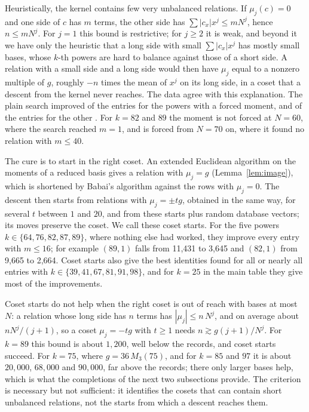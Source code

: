 \documentclass[11pt]{amsart}
\theoremstyle{definition}
\theoremstyle{remark}
\begin{document}
Heuristically, the kernel contains few very unbalanced relations. If $\mu_j(c)=0$ and one side of
$c$ has $m$ terms, the other side has $\sum|c_x|x^j\le mN^j$, hence $n\le mN^j$. For $j=1$ this
bound is restrictive; for $j\ge2$ it is weak, and beyond it we have only the heuristic that a long
side with small $\sum|c_x|x^j$ has mostly small bases, whose $k$-th powers are hard to balance
against those of a short side. A relation with a small side and a long side would then have
$\mu_j$ equal to a nonzero multiple of $g$, roughly $-n$ times the mean of $x^j$ on its long side,
in a coset that a descent from the kernel never reaches. The data agree with this explanation.
The plain search improved \ForcedSieveImp{} of the \ForcedCells{} entries for the \ForcedK{}
powers with a forced moment, and \UnforcedSieveImp{} of the \UnforcedCells{} entries for the
other \UnforcedK. For $k=82$ and $89$ the moment is not forced at $N=60$, where the search reached
$m=1$, and is forced from $N=70$ on, where it found no relation with $m\le40$.

The cure is to start in the right coset. An extended Euclidean algorithm on the moments of a
reduced basis gives a relation with $\mu_j=g$ (Lemma~\ref{lem:image}), which is shortened by
Babai's algorithm \cite{Babai1986} against the rows with $\mu_j=0$. The descent then starts from
relations with $\mu_j=\pm tg$, obtained in the same way, for several $t$ between $1$ and $20$, and
from these starts plus random database vectors; its moves preserve the coset. We call these
coset starts. For the five powers $k\in\{64,76,82,87,89\}$, where nothing else had worked, they
improve every entry with $m\le16$; for example $(89,1)$ falls from 11{,}431 to 3{,}645 and
$(82,1)$ from 9{,}665 to 2{,}664. Coset starts also give the best identities found for all or
nearly all entries with $k\in\{39,41,67,81,91,98\}$, and for $k=25$ in the main table they give
most of the improvements.

Coset starts do not help when the right coset is out of reach with bases at most
$N$: a relation whose long side has $n$ terms has $|\mu_j|\le n\,N^j$, and on average about
$nN^j/(j+1)$, so a coset $\mu_j=-tg$ with $t\ge1$ needs $n\gtrsim g(j+1)/N^j$. For $k=89$ this bound is about $1{,}200$, well below the records, and coset starts
succeed. For $k=75$, where $g=36\,M_3(75)$, and for $k=85$ and $97$ it is about $20{,}000$,
$68{,}000$ and $90{,}000$, far above the records; there only larger bases help, which is what
the completions of the next two subsections provide. The criterion is necessary but not
sufficient: it identifies the cosets that can contain short unbalanced relations, not the starts
from which a descent reaches them.
\end{document}
